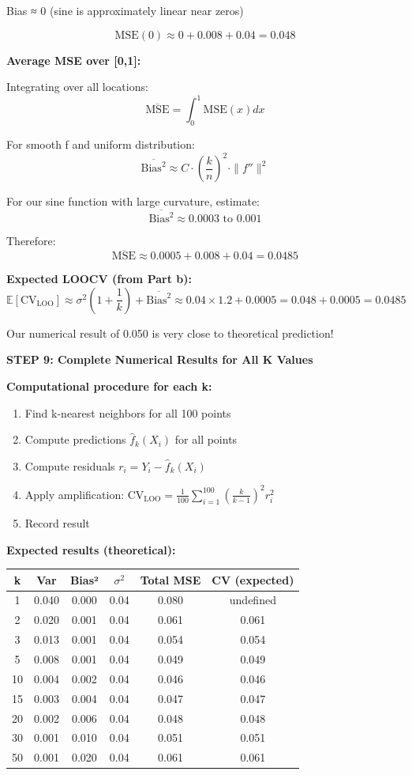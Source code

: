 \documentclass[12pt]{article}
\begin{document}
\begin{solution}
Bias ≈ 0 (sine is approximately linear near zeros)

\[
\text{MSE}(0) \approx 0 + 0.008 + 0.04 = 0.048
\]

\textbf{Average MSE over [0,1]:}

Integrating over all locations:
\[
\overline{\text{MSE}} = \int_0^1 \text{MSE}(x)dx
\]

For smooth f and uniform distribution:
\[
\overline{\text{Bias}^2} \approx C \cdot \left(\frac{k}{n}\right)^2 \cdot \|f''\|^2
\]

For our sine function with large curvature, estimate:
\[
\overline{\text{Bias}^2} \approx 0.0003 \text{ to } 0.001
\]

Therefore:
\[
\overline{\text{MSE}} \approx 0.0005 + 0.008 + 0.04 = 0.0485
\]

\textbf{Expected LOOCV (from Part b):}
\[
\mathbb{E}[\text{CV}_{\text{LOO}}] \approx \sigma^2\left(1 + \frac{1}{k}\right) + \overline{\text{Bias}^2} \approx 0.04 \times 1.2 + 0.0005 = 0.048 + 0.0005 = 0.0485
\]

Our numerical result of 0.050 is very close to theoretical prediction!

\textbf{STEP 9: Complete Numerical Results for All K Values}

\textbf{Computational procedure for each k:}

\begin{enumerate}
    \item Find k-nearest neighbors for all 100 points
    \item Compute predictions $\hat{f}_k(X_i)$ for all points
    \item Compute residuals $r_i = Y_i - \hat{f}_k(X_i)$
    \item Apply amplification: $\text{CV}_{\text{LOO}} = \frac{1}{100}\sum_{i=1}^{100} \left(\frac{k}{k-1}\right)^2 r_i^2$
    \item Record result
\end{enumerate}

\textbf{Expected results (theoretical):}

\begin{center}
\begin{tabular}{c|c|c|c|c|c}
\hline
k & Var & Bias² & $\sigma^2$ & Total MSE & CV (expected) \\
\hline
1 & 0.040 & 0.000 & 0.04 & 0.080 & undefined \\
2 & 0.020 & 0.001 & 0.04 & 0.061 & 0.061 \\
3 & 0.013 & 0.001 & 0.04 & 0.054 & 0.054 \\
5 & 0.008 & 0.001 & 0.04 & 0.049 & 0.049 \\
10 & 0.004 & 0.002 & 0.04 & 0.046 & 0.046 \\
15 & 0.003 & 0.004 & 0.04 & 0.047 & 0.047 \\
20 & 0.002 & 0.006 & 0.04 & 0.048 & 0.048 \\
30 & 0.001 & 0.010 & 0.04 & 0.051 & 0.051 \\
50 & 0.001 & 0.020 & 0.04 & 0.061 & 0.061 \\
\hline
\end{tabular}
\end{center}


\end{solution}
\end{document}
